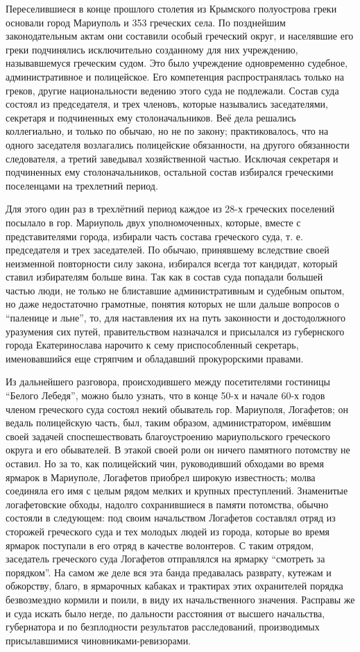 Переселившиеся в конце прошлого столетия из Крымского полуострова греки
основали город Мариуполь и 353 греческих села.  По позднейшим законодательным
актам они составили особый греческий округ, и населявшие его греки подчинялись
исключительно созданному для них учреждению, называвшемуся греческим судом. Это
было учреждение одновременно судебное, административное и полицейское.  Его
компетенция распространялась только на греков, другие национальности ведению
этого суда не подлежали. Состав суда состоял из председателя, и трех членовъ,
которые назывались заседателями, секретаря и подчиненных ему столоначальников.
Веё дела решались коллегиально, и только по обычаю, но не по закону;
практиковалось, что на одного заседателя возлагались полицейские обязанности,
на другого обязанности следователя, а третий заведывал хозяйственной частью.
Исключая секретаря и подчиненных ему столоначальников, остальной состав
избирался греческими поселенцами на трехлетний период.

Для этого один раз в трехлётний период каждое
из 28-х греческих поселений посылало в гор. Мариуполь
двух уполномоченных, которые, вместе с представителями города, избирали часть состава
греческого суда, т. е. председателя и трех заседателей. По обычаю, принявшему вследствие своей неизменной
повторности силу закона, избирался всегда тот кандидат, который ставил избирателям больше вина.
Так как в состав суда попадали большей частью люди, не только не блиставшие административным и судебным опытом,
но даже недостаточно грамотные, понятия которых не шли дальше вопросов о ``паленице и льне'', то,
для наставления их на путь законности и достодолжного уразумения сих путей, правительством назначался
и присылался из губернского города Екатеринослава нарочито к сему приспособленный секретарь, именовавшийся
еще стряпчим и обладавший прокурорскими правами.

Из дальнейшего разговора, происходившего между посетителями гостиницы ``Белого
Лебедя'', можно было узнать, что в конце 50-х и начале 60-х годов членом
греческого суда состоял некий обыватель гор. Мариуполя, Логафетов; он ведаль
полицейскую часть, был, таким образом, администратором, имёвшим своей задачей
споспешествовать благоустроению мариупольского греческого округа и его
обывателей. В этакой своей роли он ничего памятного потомству не оставил. Но за
то, как полицейский чин, руководивший обходами во время ярмарок в Мариуполе,
Логафетов приобрел широкую известность; молва соединяла его имя с целым рядом
мелких и крупных преступлений. Знаменитые логафетовские обходы, надолго
сохранившиеся в памяти потомства, обычно состояли в следующем: под своим
начальством Логафетов составлял отряд из сторожей греческого суда и тех молодых
людей из города, которые во время ярмарок поступали в его отряд в качестве
волонтеров. С таким отрядом, заседатель греческого суда Логафетов отправлялся
на ярмарку ``смотреть за порядком''. На самом же деле вся эта банда предавалась
разврату, кутежам и обжорству, благо, в ярмарочных кабаках и трактирах этих
охранителей порядка безвозмездно кормили и поили, в виду
их начальственного значения. Расправы же и суда искать
было негде, по дальности расстояния от высшего начальства, губернатора и по безплодности
результатов расследований, производимых присылавшимися чиновниками-ревизорами.

